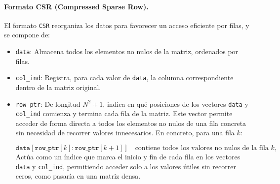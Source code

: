 \documentclass{article}
\begin{document}
\paragraph{Formato CSR (Compressed Sparse Row).} El formato \texttt{CSR} reorganiza los datos para favorecer un acceso eficiente por filas, y se compone de:
\label{paragraph:csr}
\begin{itemize}
    \item \texttt{data}: Almacena todos los elementos no nulos de la matriz, ordenados por filas.
    \item \texttt{col\_ind}: Registra, para cada valor de \texttt{data}, la columna correspondiente dentro de la matriz original.
    \item \texttt{row\_ptr}: De longitud $N^2 + 1$, indica en qué posiciones de los vectores \texttt{data} y \texttt{col\_ind} comienza y termina cada fila de la matriz. Este vector permite acceder de forma directa a todos los elementos no nulos de una fila concreta sin necesidad de recorrer valores innecesarios. En concreto, para una fila $k$:

    $$
    \texttt{data}[\texttt{row\_ptr}[k] : \texttt{row\_ptr}[k+1]]
    \quad \text{contiene todos los valores no nulos de la fila } k,
    $$
    Actúa como un índice que marca el inicio y fin de cada fila en los vectores \texttt{data} y \texttt{col\_ind}, permitiendo acceder solo a los valores útiles sin recorrer ceros, como pasaría en una matriz densa.
\end{itemize}
\end{document}
